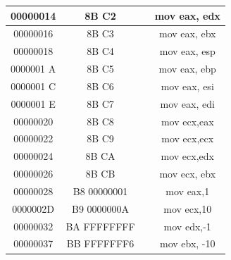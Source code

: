 \documentclass[10pt]{book}
\begin{document}
\begin{center}
\begin{tabular}{|c|c|c|c|}
\hline
00000014 & 8B C2 &  & mov eax, edx \\
\hline
00000016 & 8B C3 &  & mov eax, ebx \\
\hline
00000018 & 8B C4 &  & mov eax, esp \\
\hline
0000001 A & 8B C5 &  & mov eax, ebp \\
\hline
0000001 C & 8B C6 &  & mov eax, esi \\
\hline
0000001 E & 8B C7 &  & mov eax, edi \\
\hline
00000020 & 8B C8 &  & mov ecx,eax \\
\hline
00000022 & 8B C9 &  & mov ecx,ecx \\
\hline
00000024 & 8B CA &  & mov ecx,edx \\
\hline
00000026 & 8B CB &  & mov ecx, ebx \\
\hline
00000028 & B8 00000001 &  & mov eax,1 \\
\hline
0000002D & B9 0000000A &  & mov ecx,10 \\
\hline
00000032 & BA FFFFFFFF &  & mov edx,-1 \\
\hline
00000037 & BB FFFFFFF6 &  & mov ebx, -10 \\
\hline
\end{tabular}
\end{center}
\end{document}

